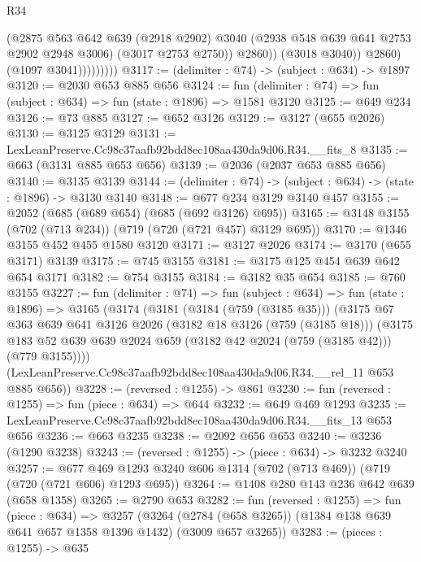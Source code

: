 \begin{lexlean}{R34}
\begin{coremodule}
                            (@2875
                              @563
                              @642
                              @639
                              (@2918 @2902)
                              @3040
                              (@2938 @548 @639 @641 @2753 @2902 @2948 @3006)
                              (@3017 @2753 @2750))
                            @2860))
                        (@3018 @3040))
                      @2860)
                    (@1097 @3041)))))))))
@3117 := (delimiter : @74) -> (subject : @634) -> @1897
@3120 := @2030 @653 @885 @656
@3124 := fun (delimiter : @74) => fun (subject : @634) => fun (state : @1896) => @1581 @3120
@3125 := @649 @234
@3126 := @73 @885
@3127 := @652 @3126
@3129 := @3127 (@655 @2026)
@3130 := @3125 @3129
@3131 := LexLeanPreserve.Cc98c37aafb92bdd8ec108aa430da9d06.R34.__fits_8
@3135 := @663 (@3131 @885 @653 @656)
@3139 := @2036 (@2037 @653 @885 @656)
@3140 := @3135 @3139
@3144 := (delimiter : @74) -> (subject : @634) -> (state : @1896) -> @3130 @3140
@3148 := @677 @234 @3129 @3140 @457
@3155 := @2052 (@685 (@689 @654) (@685 (@692 @3126) @695))
@3165 := @3148 @3155 (@702 (@713 @234)) (@719 (@720 (@721 @457) @3129 @695))
@3170 := @1346 @3155 @452 @455 @1580 @3120
@3171 := @3127 @2026
@3174 := @3170 (@655 @3171) @3139
@3175 := @745 @3155
@3181 := @3175 @125 @454 @639 @642 @654 @3171
@3182 := @754 @3155
@3184 := @3182 @35 @654
@3185 := @760 @3155
@3227 := fun (delimiter : @74) =>
  fun (subject : @634) =>
  fun (state : @1896) =>
  @3165
    (@3174
      (@3181
        (@3184 (@759 (@3185 @35)))
        (@3175
          @67
          @363
          @639
          @641
          @3126
          @2026
          (@3182 @18 @3126 (@759 (@3185 @18)))
          (@3175 @183 @52 @639 @639 @2024 @659 (@3182 @42 @2024 (@759 (@3185 @42))) (@779 @3155))))
      (LexLeanPreserve.Cc98c37aafb92bdd8ec108aa430da9d06.R34.__rel_11 @653 @885 @656))
@3228 := (reversed : @1255) -> @861
@3230 := fun (reversed : @1255) => fun (piece : @634) => @644
@3232 := @649 @469 @1293
@3235 := LexLeanPreserve.Cc98c37aafb92bdd8ec108aa430da9d06.R34.__fits_13 @653 @656
@3236 := @663 @3235
@3238 := @2092 @656 @653
@3240 := @3236 (@1290 @3238)
@3243 := (reversed : @1255) -> (piece : @634) -> @3232 @3240
@3257 := @677 @469 @1293 @3240 @606 @1314 (@702 (@713 @469)) (@719 (@720 (@721 @606) @1293 @695))
@3264 := @1408 @280 @143 @236 @642 @639 (@658 @1358)
@3265 := @2790 @653
@3282 := fun (reversed : @1255) =>
  fun (piece : @634) =>
  @3257
    (@3264 (@2784 (@658 @3265)) (@1384 @138 @639 @641 @657 @1358 @1396 @1432) (@3009 @657 @3265))
@3283 := (pieces : @1255) -> @635

\end{coremodule}
\end{lexlean}
